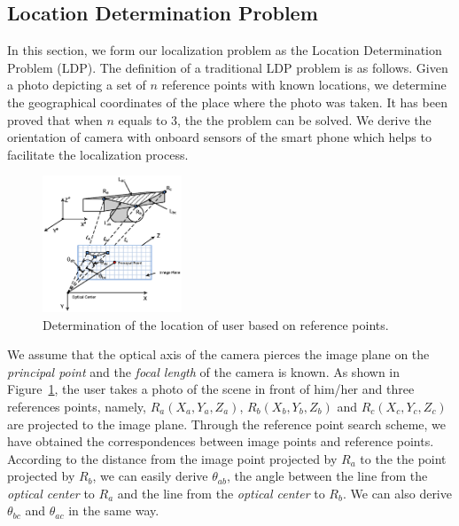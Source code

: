 
\subsection{Location Determination Problem}
In this section, we form our localization problem as the Location Determination Problem (LDP)\cite{fischler1981random}. The definition of a traditional LDP problem is as follows. Given a photo depicting a set of $n$ reference points with known locations, we determine the geographical coordinates of the place where the photo was taken. It has been proved that when $n$ equals to 3, the the problem can be solved\cite{fischler1981random}. We derive the orientation of camera with onboard sensors of the smart phone which helps to facilitate the localization process.
\begin{figure}[!ht]
\centering
\includegraphics[width=1\linewidth, height=1.6in, clip,keepaspectratio]{ldp2cc.eps}
\caption{Determination of the location of user based on reference points.}\label{fig_ldp}
\end{figure}
We assume that the optical axis of the camera pierces the image plane on the \emph{principal point} and the \emph{focal length} of the camera is known.
As shown in Figure~\ref{fig_ldp}, the user takes a photo of the scene in front of him/her and three references points, namely, $R_a(X_a, Y_a, Z_a)$, $R_b(X_b, Y_b, Z_b)$ and $R_c(X_c, Y_c, Z_c)$ are projected to the image plane.
Through the reference point search scheme, we have obtained the correspondences between image points and reference points.
According to the distance from the image point projected by $R_a$ to the the point projected by $R_b$, we can easily derive $\theta_{ab}$, the angle between the line from the \emph{optical center} to $R_a$ and the line from the \emph{optical center} to $R_b$. We can also derive $\theta_{bc}$ and $\theta_{ac}$ in the same way.
